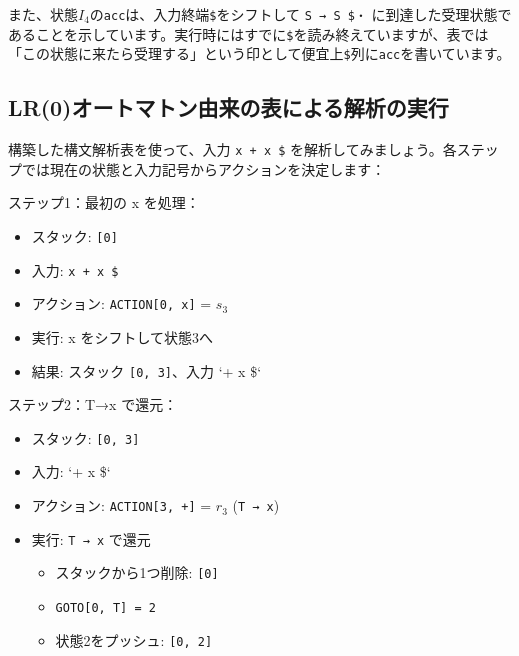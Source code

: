 また、状態\(I_4\)の\texttt{acc}は、入力終端\texttt{\$}をシフトして
\texttt{S\textquotesingle{}\ →\ S\ \$・}
に到達した受理状態であることを示しています。実行時にはすでに\texttt{\$}を読み終えていますが、表では「この状態に来たら受理する」という印として便宜上\texttt{\$}列に\texttt{acc}を書いています。

\hypertarget{chapter5-lr0ux30aaux30fcux30c8ux30deux30c8ux30f3ux7531ux6765ux306eux8868ux306bux3088ux308bux89e3ux6790ux306eux5b9fux884c}{%
\subsection{LR(0)オートマトン由来の表による解析の実行}\label{chapter5-lr0ux30aaux30fcux30c8ux30deux30c8ux30f3ux7531ux6765ux306eux8868ux306bux3088ux308bux89e3ux6790ux306eux5b9fux884c}}

構築した構文解析表を使って、入力 \texttt{x\ +\ x\ \$}
を解析してみましょう。各ステップでは現在の状態と入力記号からアクションを決定します：

ステップ1：最初の x を処理：

\begin{itemize}
\tightlist
\item
  スタック: \texttt{{[}0{]}}
\item
  入力: \texttt{x\ +\ x\ \$}
\item
  アクション: \texttt{ACTION{[}0,\ x{]}} = \(s_3\)
\item
  実行: x をシフトして状態3へ
\item
  結果: スタック \texttt{{[}0,\ 3{]}}、入力 `+ x \$`
\end{itemize}

ステップ2：T→x で還元：

\begin{itemize}
\tightlist
\item
  スタック: \texttt{{[}0,\ 3{]}}
\item
  入力: `+ x \$`
\item
  アクション: \texttt{ACTION{[}3,\ +{]}} = \(r_3\) (\texttt{T\ →\ x})
\item
  実行: \texttt{T\ →\ x} で還元

  \begin{itemize}
  \tightlist
  \item
    スタックから1つ削除: \texttt{{[}0{]}}
  \item
    \texttt{GOTO{[}0,\ T{]}\ =\ 2}
  \item
    状態2をプッシュ: \texttt{{[}0,\ 2{]}}
  \end{itemize}
\end{itemize}

